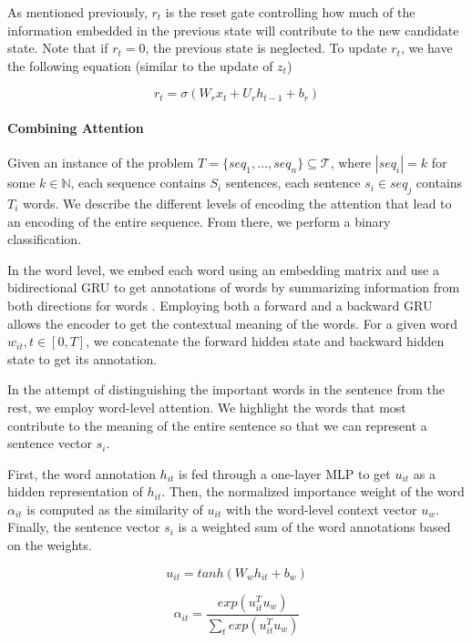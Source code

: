 As mentioned previously, $r_t$ is the reset gate 
controlling how much of the information embedded in 
the previous state will contribute to the new candidate state. 
Note that if $r_t = 0$, the previous state is neglected. 
To update $r_t$, we have the following equation (similar to the update of $z_t$)

\begin{equation*}
	r_t = \sigma(W_r x_t + U_r h_{t-1} + b_r)
\end{equation*}

\paragraph*{Combining Attention}
Given an instance of the problem $T=\{seq_1, \ldots, seq_n\} \subseteq \mathcal{T}$, where $|seq_i| = k$ for some $k \in \mathbb{N}$, each sequence contains $S_i$ sentences, each sentence $s_i \in seq_j$ contains $T_i$ words. 
We describe the different levels of encoding the attention that lead 
to an encoding of the entire sequence. From there, we perform 
a binary classification. 

In the word level, we embed each word using an embedding matrix \cite{glove} 
and use a bidirectional GRU 
to get annotations of words by summarizing information
from both directions for words \cite{attention}. 
Employing both a forward and a backward GRU 
allows the encoder to get the contextual meaning of the words. 
For a given word $w_{it}, t\in [0,T]$, 
we concatenate the forward hidden state and
backward hidden state to get its annotation. 

In the attempt of distinguishing the important 
words in the sentence from the rest, we employ word-level 
attention. We highlight the words that most contribute 
to the meaning of the entire sentence so that we can represent 
a sentence vector $s_i$. 

First, the word annotation $h_{it}$ is fed 
through a one-layer MLP to get $u_{it}$ as a hidden representation
of $h_{it}$. Then, the normalized importance weight of the word $\alpha_{it}$ 
is computed as the similarity of $u_{it}$ with the word-level 
context vector $u_w$. 
Finally, the sentence vector $s_i$ is a weighted sum of the word annotations
based on the weights. 

\begin{equation*}
	u_{it} = tanh(W_w h_{it} + b_w)
\end{equation*}

\begin{equation*}
	\alpha_{it} = \frac{exp(u^T_{it} u_w)}{\sum_t exp(u^T_{it} u_w)}
\end{equation*}

